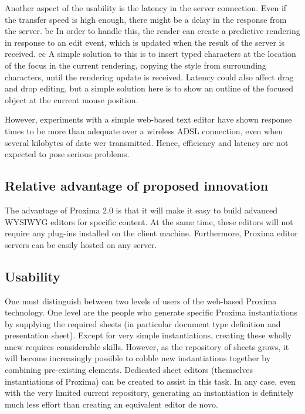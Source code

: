 \documentclass[10pt]{article}
\begin{document}
Another aspect of the usability is the latency in the server connection. Even if the transfer speed is high enough, there might be a delay in the response from the server. bc 
In order to handle this, the render can create a predictive rendering in response to an edit event, which is updated when the result of the server is received.
ec
A simple solution to this is to insert typed characters at the location of the focus in the current rendering, copying the style from surrounding characters, until the rendering update is received. Latency could also affect drag and drop editing, but a simple solution here is to show an outline of the focused object at the current mouse position. 

However, experiments with a simple web-based text editor have shown response times to be more than adequate over a wireless ADSL connection, even when several kilobytes of date wer transmitted. Hence, efficiency and latency are not expected to pose serious problems. 
\ec

\subsection{Relative advantage of proposed innovation}

The advantage of Proxima 2.0 is that it will make it easy to build advanced WYSIWYG editors for specific content. At the same time, these editors will not require any plug-ins installed on the client machine. Furthermore, Proxima editor servers can be easily hosted on any server.


\subsection{Usability}

One must distinguish between two levels of users of the web-based Proxima technology. One level are the people who generate specific Proxima instantiations by supplying the required sheets (in particular document type definition and presentation sheet). Except for very simple instantiations, creating these wholly anew requires considerable skills. However, as the repository of sheets grows, it will become increasingly possible to cobble new instantiations together by combining pre-existing elements.  Dedicated sheet editors (themselves instantiations of Proxima) can be created to assist in this task. In any case, even with the very limited current repository, generating an instantiation is definitely much less effort than creating an equivalent editor de novo.
\end{document}

